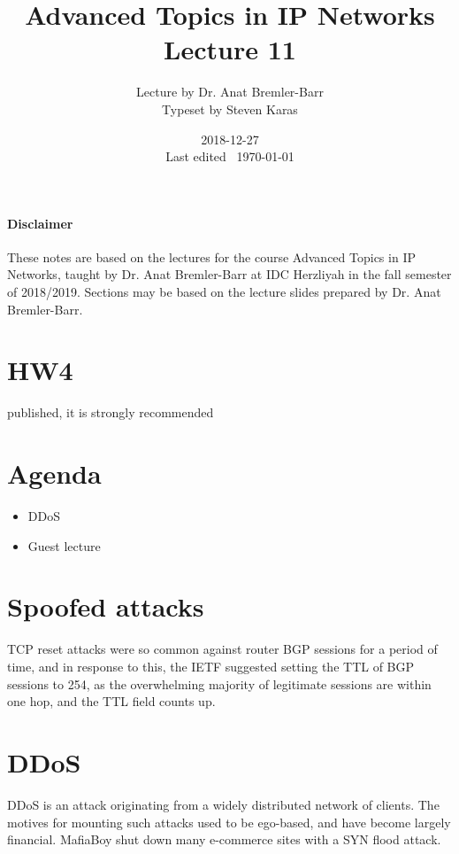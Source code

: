 \documentclass{idc_msc}
\title{Advanced Topics in IP Networks \\\large Lecture 11}
\date{2018-12-27 \\ Last edited \currenttime\ \today}
\author{Lecture by Dr. Anat Bremler-Barr\\Typeset by Steven Karas}
\begin{document}
\maketitle

\paragraph{Disclaimer}

These notes are based on the lectures for the course Advanced Topics in IP Networks, taught by Dr. Anat Bremler-Barr at IDC Herzliyah in the fall semester of 2018/2019.
Sections may be based on the lecture slides prepared by Dr. Anat Bremler-Barr.

\nocite{Varghese:2004:NAI:1203994}
\nocite{Crovella:2006:IMI:1196480}
\nocite{Kurose:2002:CNT:549735}

\section{HW4}

published, it is strongly recommended 

\section{Agenda}

\begin{itemize}
  \item DDoS
  \item Guest lecture
\end{itemize}

\section{Spoofed attacks}

TCP reset attacks were so common against router BGP sessions for a period of time, and in response to this, the IETF suggested setting the TTL of BGP sessions to 254, as the overwhelming majority of legitimate sessions are within one hop, and the TTL field counts up.

\section{DDoS}

DDoS is an attack originating from a widely distributed network of clients.
The motives for mounting such attacks used to be ego-based, and have become largely financial.
MafiaBoy shut down many e-commerce sites with a SYN flood attack.
\end{document}
